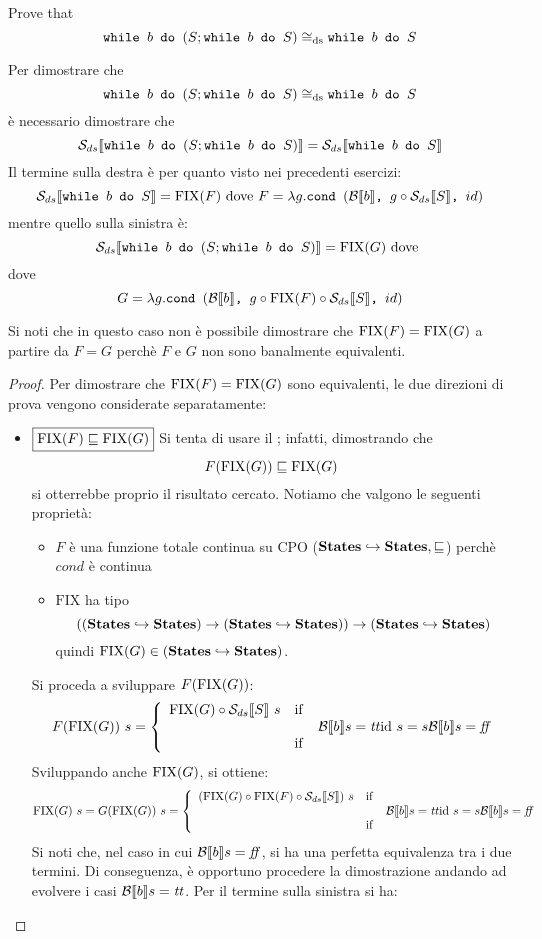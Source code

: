 {Prove that
$$
	 \wbS{b}{(S; \wbS{b}{S})} \eqDS \wbS{b}{S}
$$
}
{
Per dimostrare che 
$$
	 \wbS{b}{(S; \wbS{b}{S})} \eqDS \wbS{b}{S}
$$	
è necessario dimostrare che
$$
\dsCtxt{\wbS{b}{(S; \wbS{b}{S})}} = \dsCtxt{\wbS{b}{S}}
$$
Il termine sulla destra è per quanto visto nei precedenti esercizi:
$$
\dsCtxt{\wbS{b}{S}} =
\fixp{F} \text{ dove } F = \lambda g. \cond{b}{g \circ \dsCtxt{S}}{id}
$$
mentre quello sulla sinistra è:
$$
\dsCtxt{\wbS{b}{(S; \wbS{b}{S}})} = \fixp{G} \text{ dove }
$$
dove
$$
G = \lambda g. \cond{b}{g \circ \fixp{F} \circ \dsCtxt{S}}{id}
$$

Si noti che in questo caso non è possibile dimostrare che $\fixp{F} = \fixp{G}$
a partire da $F = G$ perchè $F$ e $G$ non sono banalmente equivalenti.

\begin{proof}
Per dimostrare che $\fixp{F} = \fixp{G}$ sono equivalenti, le due direzioni di
prova vengono considerate separatamente:
\begin{itemize}
	\item $\boxed{\fixp{F} \sqsubseteq \fixp{G}}$
	Si tenta di usare il \FPIL; infatti, dimostrando che
	$$
	F(\fixp{G}) \sqsubseteq \fixp{G}
	$$
	si otterrebbe proprio il risultato cercato.
  Notiamo che valgono le seguenti proprietà:
  \begin{itemize}
   \item $F$ è una funzione totale continua su CPO 
($\states \hookrightarrow \states, \sqsubseteq$) perchè $cond$ è continua
  \item $\text{FIX}$ ha tipo
$$
((\states \hookrightarrow \states) \rightarrow 
(\states \hookrightarrow \states)) \rightarrow
(\states \hookrightarrow \states)
$$ 
quindi $\fixp{G} \in 
(\states \hookrightarrow \states)$.
  \end{itemize}
  Si proceda a sviluppare $F(\fixp{G})$:
  $$
  F(\fixp{G})\ s = \caseFun{\fixp{G} \circ \dsCtxt{S}\ s}
                        {\B{b} = \semtrue}
                        {\idDS\ s = s}
                        {\B{b} = \semfalse}
  $$
  Sviluppando anche $\fixp{G}$, si ottiene:
  $$
  \fixp{G}\ s =
  G(\fixp{G})\ s = \caseFun{(\fixp{G} \circ \fixp{F} \circ \dsCtxt{S})\ s}
                        {\B{b} = \semtrue}
                        {\idDS\ s = s}
                        {\B{b} = \semfalse}
  $$
  Si noti che, nel caso in cui $\B{b} = \semfalse$, si ha una perfetta
  equivalenza tra i due termini.
  Di conseguenza, è opportuno procedere la dimostrazione andando ad evolvere i
  casi $\B{b} = \semtrue$. Per il termine sulla sinistra si ha:

\end{itemize}
\end{proof}}
